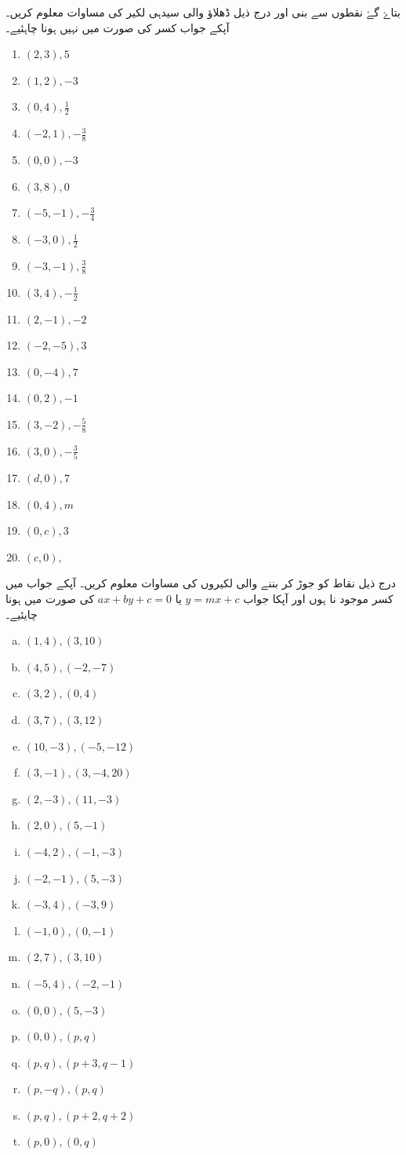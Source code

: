  بتاۓ گۓ نقطوں سے بنی اور درج ذیل ڈھلاؤ والی   سیدہی لکیر کی مساوات معلوم کریں۔ آپکے جواب کسر کی صورت میں نہیں ہونا چاہئیے۔
\begin{multicols}{4}
\begin{enumerate}[.a]
\item \((2,3), 5\)
\item \((1,2), -3\)
\item \((0,4),\frac{1}{2}\)
\item \((-2,1),-\frac{3}{8}\)
\item \((0,0),-3\)
\item \((3,8), 0\)
\item \((-5,-1),-\frac{3}{4}\)
\item \((-3,0), \frac{1}{2}\)
\item \((-3, -1),\frac{3}{8}\)
\item \((3,4),-\frac{1}{2}\)
\item \((2,-1),-2\)
\item \((-2,-5), 3\)
\item \((0,-4), 7\)
\item \((0,2),-1\)
\item \((3,-2), -\frac{5}{8}\)
\item \((3,0), -\frac{3}{5}\)
\item \((d,0),7\)
\item \((0,4),m\)
\item \((0,c),3\)
\item \((c,0),\)
\end{enumerate}
\end{multicols}
درج ذیل نقاط کو جوڑ کر بننے والی لکیروں کی مساوات معلوم کریں۔ آپکے جواب میں کسر موجود نا ہوں اور آپکا جواب \(y=mx+c  \)    یا   \(ax+by+c=0\) کی صورت میں ہونا چایئیے۔
\begin{multicols}{3}
\begin{enumerate}[a.]
\item \((1,4),(3,10)\)
\item \((4,5),(-2,-7)\)
\item \((3,2),(0,4)\)
\item \((3,7),(3,12)\)
\item \((10,-3),(-5,-12)\)
\item \((3,-1),(3,-4,20)\)
\item \((2,-3),(11,-3)\)
\item \((2,0),(5,-1)\)
\item \((-4,2),(-1,-3)\)
\item \((-2,-1),(5,-3)\)
\item \((-3,4),(-3,9)\)
\item \((-1,0),(0,-1)\)
\item \((2,7),(3,10)\)
\item \((-5,4),(-2,-1)\)
\item \((0,0),(5,-3)\)
\item \((0,0),(p,q)\)
\item \((p,q),(p+3,q-1)\)
\item \((p,-q),(p,q)\)
\item \((p,q),(p+2,q+2)\)
\item \((p,0),(0,q)\)
\end{enumerate}
\end{multicols}
